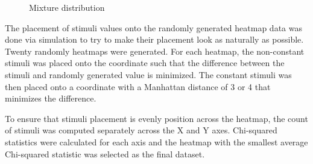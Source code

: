 \documentclass[
  letterpaper,
  DIV=11,
  numbers=noendperiod]{scrartcl}
\begin{document}
\begin{figure}
\begin{minipage}{0.20\linewidth}
{}


\end{minipage}%
%
\begin{minipage}{0.20\linewidth}



\end{minipage}%

\caption{\label{fig-random-z}Mixture distribution}

\end{figure}%

The placement of stimuli values onto the randomly generated heatmap data
was done via simulation to try to make their placement look as naturally
as possible. Twenty randomly heatmaps were generated. For each heatmap,
the non-constant stimuli was placed onto the coordinate such that the
difference between the stimuli and randomly generated value is
minimized. The constant stimuli was then placed onto a coordinate with a
Manhattan distance of 3 or 4 that minimizes the difference.

To ensure that stimuli placement is evenly position across the heatmap,
the count of stimuli was computed separately across the X and Y axes.
Chi-squared statistics were calculated for each axis and the heatmap
with the smallest average Chi-squared statistic was selected as the
final dataset.
\end{document}
